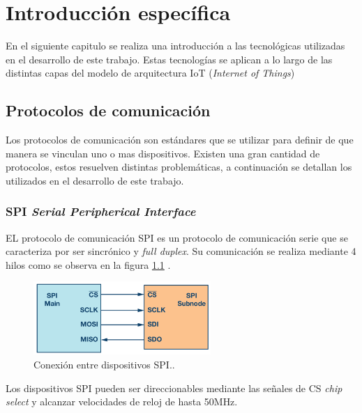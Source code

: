 \chapter{Introducción específica} %

\label{Chapter2}

En el siguiente capitulo se realiza una introducción a las tecnológicas utilizadas en el desarrollo de este trabajo. Estas tecnologías se aplican a lo largo de las distintas capas del modelo de arquitectura IoT (\textit{Internet of Things})
\section{Protocolos de comunicación}
\label{sec:ejemplo}

Los protocolos de comunicación son estándares que se utilizar para definir de que manera se vinculan uno o mas dispositivos. Existen una gran cantidad de protocolos, estos resuelven distintas problemáticas, a continuación se detallan los utilizados en el desarrollo de este trabajo.

\subsection{SPI \textit{Serial Peripherical Interface}}

EL protocolo de comunicación SPI es un protocolo de comunicación serie que se caracteriza por ser sincrónico y \textit{full duplex}.
Su comunicación se realiza mediante 4 hilos como se observa en la figura \ref{fig:SPI} .

\begin{figure}[htbp]
	\centering
	\includegraphics[width=0.6\textwidth]{./Figures/SPI.png}
	\caption{Conexión entre dispositivos SPI.\protect\footnotemark.}
	\label{fig:SPI}
\end{figure} 

Los dispositivos SPI pueden ser direccionables mediante las señales de CS \textit{chip select} y alcanzar velocidades de reloj de hasta 50MHz. 

